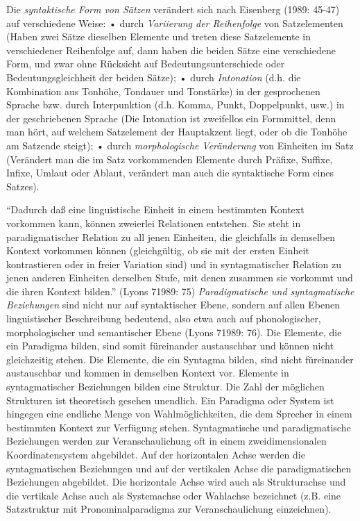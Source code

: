 \documentclass[
]{article}
\begin{document}
Die \emph{syntaktische Form von Sätzen} verändert sich nach Eisenberg (1989: 45-47) auf verschiedene Weise:
• durch \emph{Variierung der Reihenfolge} von Satzelementen (Haben zwei Sätze dieselben Elemente und treten diese Satzelemente in verschiedener Reihenfolge auf, dann haben die beiden Sätze eine verschiedene Form, und zwar ohne Rücksicht auf Bedeutungsunterschiede oder Bedeutungsgleichheit der beiden Sätze);
• durch \emph{Intonation} (d.h. die Kombination aus Tonhöhe, Tondauer und Tonstärke) in der gesprochenen Sprache bzw. durch Interpunktion (d.h. Komma, Punkt, Doppelpunkt, usw.) in der geschriebenen Sprache (Die Intonation ist zweifellos ein Formmittel, denn man hört, auf welchem Satzelement der Hauptakzent liegt, oder ob die Tonhöhe am Satzende steigt);
• durch \emph{morphologische Veränderung} von Einheiten im Satz (Verändert man die im Satz vorkommenden Elemente durch Präfixe, Suffixe, Infixe, Umlaut oder Ablaut, verändert man auch die syntaktische Form eines Satzes).

``Dadurch daß eine linguistische Einheit in einem bestimmten Kontext vorkommen kann, können zweierlei Relationen entstehen. Sie steht in paradigmatischer Relation zu all jenen Einheiten, die gleichfalls in demselben Kontext vorkommen können (gleichgültig, ob sie mit der ersten Einheit kontrastieren oder in freier Variation sind) und in syntagmatischer Relation zu jenen anderen Einheiten derselben Stufe, mit denen zusammen sie vorkommt und die ihren Kontext bilden.'' (Lyons 71989: 75) \emph{Paradigmatische und syntagmatische Beziehungen} sind nicht nur auf syntaktischer Ebene, sondern auf allen Ebenen linguistischer Beschreibung bedeutend, also etwa auch auf phonologischer, morphologischer und semantischer Ebene (Lyons 71989: 76). Die Elemente, die ein Paradigma bilden, sind somit füreinander austauschbar und können nicht gleichzeitig stehen. Die Elemente, die ein Syntagma bilden, sind nicht füreinander austauschbar und kommen in demselben Kontext vor. Elemente in syntagmatischer Beziehungen bilden eine Struktur. Die Zahl der möglichen Strukturen ist theoretisch gesehen unendlich. Ein Paradigma oder System ist hingegen eine endliche Menge von Wahlmöglichkeiten, die dem Sprecher in einem bestimmten Kontext zur Verfügung stehen. Syntagmatische und paradigmatische Beziehungen werden zur Veranschaulichung oft in einem zweidimensionalen Koordinatensystem abgebildet. Auf der horizontalen Achse werden die syntagmatischen Beziehungen und auf der vertikalen Achse die paradigmatischen Beziehungen abgebildet. Die horizontale Achse wird auch als Strukturachse und die vertikale Achse auch als Systemachse oder Wahlachse bezeichnet (z.B. eine Satzstruktur mit Pronominalparadigma zur Veranschaulichung einzeichnen).
\end{document}
